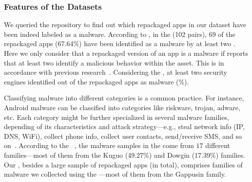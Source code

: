 

\subsubsection{Features of the Datasets}
 
We queried the \vt repository to find out which repackaged apps in our
dataset have been indeed labeled as a malware.
According to \vt, in the \sds (102 pairs),
69 of the repackaged apps (67.64\%) have been identified as a malware by at least two
\ses. Here we only consider that a repackaged version of an app is a malware if \vt reports that at least
two \ses identify a malicious behavior within the asset. This is in accordance with previous research~\cite{vt-label,DBLP:journals/ese/KhanmohammadiEH19}. Considering the \cds, at least two security engines identified \malwares out of the \apps repackaged apps as malware (\malwaresP\%).

Classifying malware into different categories is a common practice. For instance, Android malware can be classified into categories
like riskware, trojan, adware, etc. Each category might be further specialized in several malware families, depending of its
characteristics and attack strategy---e.g., steal network info (IP, DNS, WiFi), collect phone info,
collect user contacts, send/receive SMS, and so on~\cite{DBLP:conf/iccns/RahaliLKTGM20}.
According to the
\avt~\cite{avclass2-paper}, the malware samples in the \sds come from $17$ different families---most of them from the Kuguo (49.27\%) and Dowgin (17.39\%) families.  
Our \cds, besides a large sample of repackaged apps (\apps in total),
comprises  families of malware we collected using the \avt---most
of them from the Gappusin  family.

